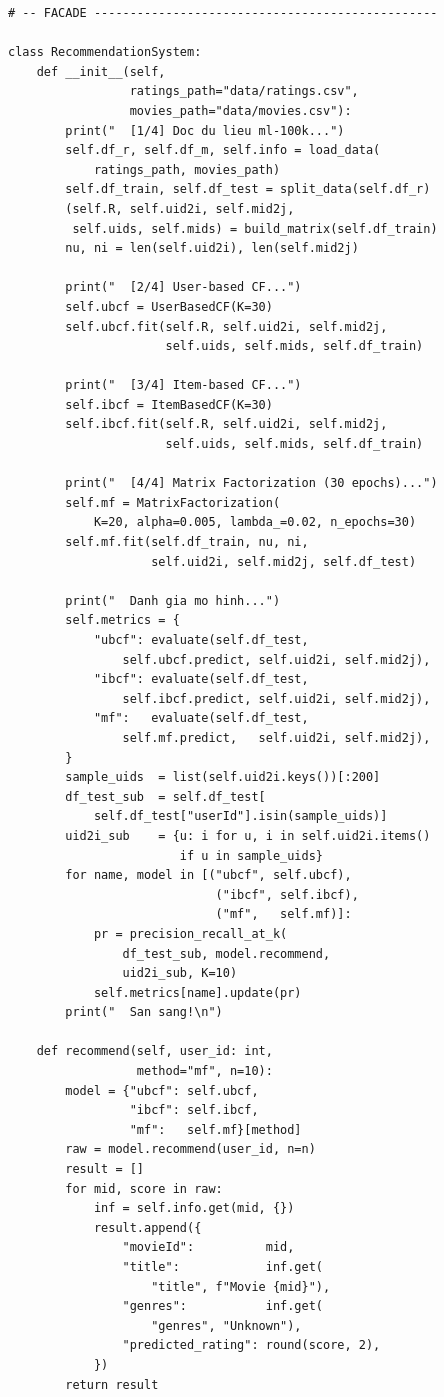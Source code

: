 ﻿\documentclass[../BTL.tex]{subfiles}
\begin{document}
\begin{lstlisting}[style=python,
    caption={models.py -- User-based CF / Item-based CF /
              Matrix Factorization / RecommendationSystem facade}]
# -- FACADE ------------------------------------------------

class RecommendationSystem:
    def __init__(self,
                 ratings_path="data/ratings.csv",
                 movies_path="data/movies.csv"):
        print("  [1/4] Doc du lieu ml-100k...")
        self.df_r, self.df_m, self.info = load_data(
            ratings_path, movies_path)
        self.df_train, self.df_test = split_data(self.df_r)
        (self.R, self.uid2i, self.mid2j,
         self.uids, self.mids) = build_matrix(self.df_train)
        nu, ni = len(self.uid2i), len(self.mid2j)

        print("  [2/4] User-based CF...")
        self.ubcf = UserBasedCF(K=30)
        self.ubcf.fit(self.R, self.uid2i, self.mid2j,
                      self.uids, self.mids, self.df_train)

        print("  [3/4] Item-based CF...")
        self.ibcf = ItemBasedCF(K=30)
        self.ibcf.fit(self.R, self.uid2i, self.mid2j,
                      self.uids, self.mids, self.df_train)

        print("  [4/4] Matrix Factorization (30 epochs)...")
        self.mf = MatrixFactorization(
            K=20, alpha=0.005, lambda_=0.02, n_epochs=30)
        self.mf.fit(self.df_train, nu, ni,
                    self.uid2i, self.mid2j, self.df_test)

        print("  Danh gia mo hinh...")
        self.metrics = {
            "ubcf": evaluate(self.df_test,
                self.ubcf.predict, self.uid2i, self.mid2j),
            "ibcf": evaluate(self.df_test,
                self.ibcf.predict, self.uid2i, self.mid2j),
            "mf":   evaluate(self.df_test,
                self.mf.predict,   self.uid2i, self.mid2j),
        }
        sample_uids  = list(self.uid2i.keys())[:200]
        df_test_sub  = self.df_test[
            self.df_test["userId"].isin(sample_uids)]
        uid2i_sub    = {u: i for u, i in self.uid2i.items()
                        if u in sample_uids}
        for name, model in [("ubcf", self.ubcf),
                             ("ibcf", self.ibcf),
                             ("mf",   self.mf)]:
            pr = precision_recall_at_k(
                df_test_sub, model.recommend,
                uid2i_sub, K=10)
            self.metrics[name].update(pr)
        print("  San sang!\n")

    def recommend(self, user_id: int,
                  method="mf", n=10):
        model = {"ubcf": self.ubcf,
                 "ibcf": self.ibcf,
                 "mf":   self.mf}[method]
        raw = model.recommend(user_id, n=n)
        result = []
        for mid, score in raw:
            inf = self.info.get(mid, {})
            result.append({
                "movieId":          mid,
                "title":            inf.get(
                    "title", f"Movie {mid}"),
                "genres":           inf.get(
                    "genres", "Unknown"),
                "predicted_rating": round(score, 2),
            })
        return result


\end{lstlisting}
\end{document}
